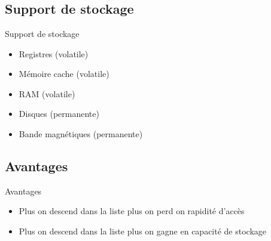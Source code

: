 \section{\sectitle}
\begin{frame}{\sectitle}
\def\subsectitle{Support de stockage}
\subsection{\subsectitle}
\begin{block}{\subsectitle}
\begin{itemize}
    \item Registres (volatile)
    \item Mémoire cache (volatile)
    \item RAM (volatile)
    \item Disques (permanente)
    \item Bande magnétiques (permanente)
\end{itemize}

\end{block}

\def\subsectitle{Avantages}
\subsection{\subsectitle}
\begin{alertblock}{\subsectitle}
\begin{itemize}
    \item Plus on descend dans la liste plus on perd on rapidité d'accès
    \item Plus on descend dans la liste plus on gagne en capacité de stockage
\end{itemize}
\end{alertblock}
\end{frame}

\def\sectitle{Protection de la mémoire}
